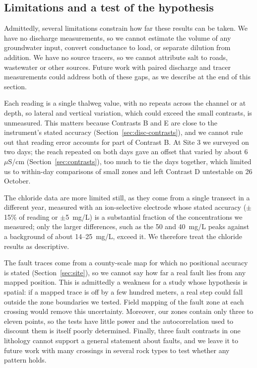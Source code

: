 \documentclass{article}
\begin{document}
\subsection{Limitations and a test of the hypothesis}\label{sec:limits}

Admittedly, several limitations constrain how far these results can be taken. We have no discharge measurements, so we cannot estimate the volume of any groundwater input, convert conductance to load, or separate dilution from addition. We have no source tracers, so we cannot attribute salt to roads, wastewater or other sources. Future work with paired discharge and tracer measurements could address both of these gaps, as we describe at the end of this section.

Each reading is a single thalweg value, with no repeats across the channel or at depth, so lateral and vertical variation, which could exceed the small contrasts, is unmeasured. This matters because Contrasts B and E are close to the instrument's stated accuracy (Section~\ref{sec:disc-contrasts}), and we cannot rule out that reading error accounts for part of Contrast B. At Site 3 we surveyed on two days; the reach repeated on both days gave an offset that varied by about 6~$\mu$S/cm (Section~\ref{sec:contrasts}), too much to tie the days together, which limited us to within-day comparisons of small zones and left Contrast D untestable on 26 October.

The chloride data are more limited still, as they come from a single transect in a different year, measured with an ion-selective electrode whose stated accuracy ($\pm$15\% of reading or $\pm$5~mg/L) is a substantial fraction of the concentrations we measured; only the larger differences, such as the 50 and 40~mg/L peaks against a background of about 14--25~mg/L, exceed it. We therefore treat the chloride results as descriptive.

The fault traces come from a county-scale map for which no positional accuracy is stated (Section~\ref{sec:site}), so we cannot say how far a real fault lies from any mapped position. This is admittedly a weakness for a study whose hypothesis is spatial: if a mapped trace is off by a few hundred meters, a real step could fall outside the zone boundaries we tested. Field mapping of the fault zone at each crossing would remove this uncertainty. Moreover, our zones contain only three to eleven points, so the tests have little power and the autocorrelation used to discount them is itself poorly determined. Finally, three fault contrasts in one lithology cannot support a general statement about faults, and we leave it to future work with many crossings in several rock types to test whether any pattern holds.
\end{document}
